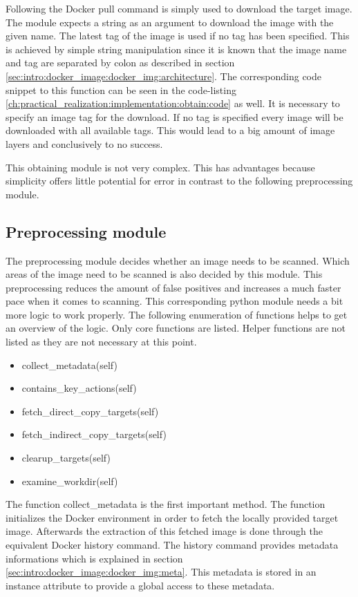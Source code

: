 Following the Docker pull command is simply used to download the target image. 
The module expects a string as an argument to download the image with the given name.
The latest tag of the image is used if no tag has been specified. 
This is achieved by simple string manipulation since it is known that the image name and tag are separated by colon as described in section \ref{sec:intro:docker_image:docker_img:architecture}.
The corresponding code snippet to this function can be seen in the code-listing \ref{ch:practical_realization:implementation:obtain:code} as well.
It is necessary to specify an image tag for the download.
If no tag is specified every image will be downloaded with all available tags.
This would lead to a big amount of image layers and conclusively to no success.

This obtaining module is not very complex. 
This has advantages because simplicity offers little potential for error in contrast to the following preprocessing module.

\subsection{Preprocessing module}
\label{ch:practical_realization:implementation:preprocessing}
The preprocessing module decides whether an image needs to be scanned. Which areas of the image need to be scanned is also decided by this module.
This preprocessing reduces the amount of false positives and increases a much faster pace when it comes to scanning.	
This corresponding python module needs a bit more logic to work properly. 
The following enumeration of functions helps to get an overview of the logic. 
Only core functions are listed.
Helper functions are not listed as they are not necessary at this point.
\begin{itemize}
\item collect\_metadata(self)
\item contains\_key\_actions(self)
\item fetch\_direct\_copy\_targets(self)
\item fetch\_indirect\_copy\_targets(self)
\item clearup\_targets(self)
\item examine\_workdir(self)
\end{itemize}
The function collect\_metadata is the first important method. 
The function initializes the Docker environment in order to fetch the locally provided target image. 
Afterwards the extraction of this fetched image is done through the equivalent Docker history command. 
The history command provides metadata informations which is explained in section \ref{sec:intro:docker_image:docker_img:meta}. 
This metadata is stored in an instance attribute to provide a global access to these metadata.

